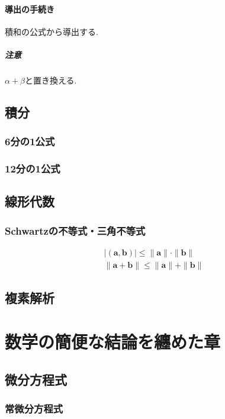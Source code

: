 \documentclass[a4paper]{report}
\begin{document}
\subsection{導出の手続き}
積和の公式から導出する.
\subsubsection{注意}
$\alpha+\beta$と置き換える.

\chapter{積分}
\section{6分の1公式}

\section{12分の1公式}

\chapter{線形代数}
\section{Schwartzの不等式・三角不等式}
\begin{equation}
    \begin{array}{l}
        |(\bm{a}, \bm{b})|\le\|\bm{a}\|\cdot\|\bm{b}\|\\
        \|\bm{a}+\bm{b}\|\le\|\bm{a}\|+\|\bm{b}\|
    \end{array}
\end{equation}

\chapter{複素解析}

\part{数学の簡便な結論を纏めた章}
\chapter{微分方程式}
\section{常微分方程式}
\end{document}
